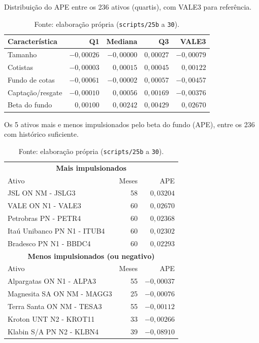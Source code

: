 \documentclass[11pt,a4paper]{article}
\begin{document}
\begin{table}[h]\centering\small
\caption{Distribuição do APE entre os 236 ativos (quartis), com VALE3 para referência.}
\begin{tabular}{@{}lrrrr@{}}
\toprule
Característica & Q1 & Mediana & Q3 & VALE3 \\
\midrule
Tamanho          & $-0{,}00026$ & $-0{,}00000$ & $0{,}00027$ & $-0{,}00079$ \\
Cotistas         & $-0{,}00003$ & $0{,}00015$  & $0{,}00045$ & $0{,}00122$  \\
Fundo de cotas   & $-0{,}00061$ & $-0{,}00002$ & $0{,}00057$ & $-0{,}00457$ \\
Captação/resgate & $-0{,}00010$ & $0{,}00056$  & $0{,}00169$ & $-0{,}00376$ \\
Beta do fundo    & $0{,}00100$  & $0{,}00242$  & $0{,}00429$ & $0{,}02670$  \\
\bottomrule
\end{tabular}
\caption*{\footnotesize Fonte: elaboração própria (\texttt{scripts/25b} a \texttt{30}).}
\end{table}

\begin{table}[h]\centering\small
\caption{Os 5 ativos mais e menos impulsionados pelo beta do fundo (APE), entre os 236 com
histórico suficiente.}
\begin{tabular}{@{}lrr@{}}
\toprule
\multicolumn{3}{c}{\textbf{Mais impulsionados}} \\
Ativo & Meses & APE \\
\midrule
JSL ON NM - JSLG3 & 58 & $0{,}03204$ \\
VALE ON N1 - VALE3 & 60 & $0{,}02670$ \\
Petrobras PN - PETR4 & 60 & $0{,}02368$ \\
Itaú Unibanco PN N1 - ITUB4 & 60 & $0{,}02302$ \\
Bradesco PN N1 - BBDC4 & 60 & $0{,}02293$ \\
\midrule
\multicolumn{3}{c}{\textbf{Menos impulsionados (ou negativo)}} \\
Ativo & Meses & APE \\
\midrule
Alpargatas ON N1 - ALPA3 & 55 & $-0{,}00037$ \\
Magnesita SA ON NM - MAGG3 & 25 & $-0{,}00076$ \\
Terra Santa ON NM - TESA3 & 55 & $-0{,}00112$ \\
Kroton UNT N2 - KROT11 & 33 & $-0{,}00266$ \\
Klabin S/A PN N2 - KLBN4 & 39 & $-0{,}08910$ \\
\bottomrule
\end{tabular}
\caption*{\footnotesize Fonte: elaboração própria (\texttt{scripts/25b} a \texttt{30}).}
\end{table}
\end{document}
